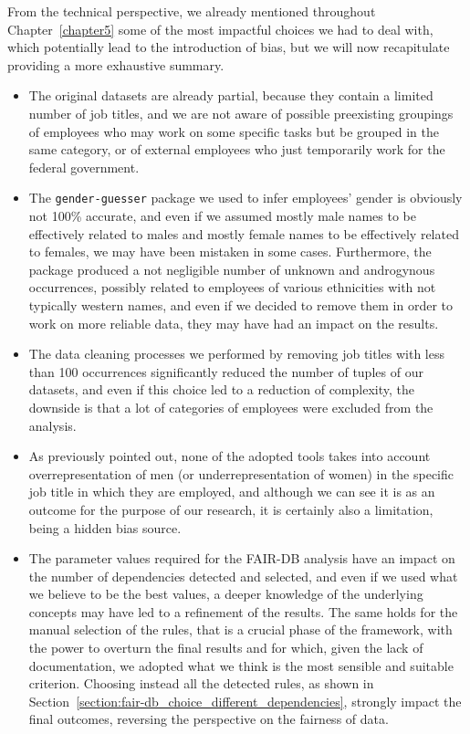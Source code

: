 From the technical perspective, we already mentioned throughout Chapter~\ref{chapter5} some of the most impactful choices we had to deal with, which potentially lead to the introduction of bias, but we will now recapitulate providing a more exhaustive summary.
\begin{itemize}
\item The original datasets are already partial, because they contain a limited number of job titles, and we are not aware of possible preexisting groupings of employees who may work on some specific tasks but be grouped in the same category, or of external employees who just temporarily work for the federal government.
\item The \texttt{gender-guesser} package we used to infer employees' gender is obviously not 100\% accurate, and even if we assumed mostly male names to be effectively related to males and mostly female names to be effectively related to females, we may have been mistaken in some cases. Furthermore, the package produced a not negligible number of unknown and androgynous occurrences, possibly related to employees of various ethnicities with not typically western names, and even if we decided to remove them in order to work on more reliable data, they may have had an impact on the results.
\item The data cleaning processes we performed by removing job titles with less than 100 occurrences significantly reduced the number of tuples of our datasets, and even if this choice led to a reduction of complexity, the downside is that a lot of categories of employees were excluded from the analysis.
\item As previously pointed out, none of the adopted tools takes into account overrepresentation of men (or underrepresentation of women) in the specific job title in which they are employed, and although we can see it is as an outcome for the purpose of our research, it is certainly also a limitation, being a hidden bias source.
\item The parameter values required for the FAIR-DB analysis have an impact on the number of dependencies detected and selected, and even if we used what we believe to be the best values, a deeper knowledge of the underlying concepts may have led to a refinement of the results. The same holds for the manual selection of the rules, that is a crucial phase of the framework, with the power to overturn the final results and for which, given the lack of documentation, we adopted what we think is the most sensible and suitable criterion. Choosing instead all the detected rules, as shown in Section~\ref{section:fair-db_choice_different_dependencies}, strongly impact the final outcomes, reversing the perspective on the fairness of data.

\end{itemize}
